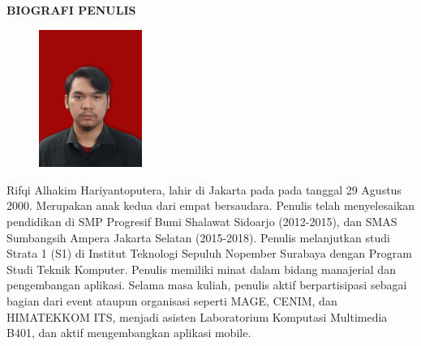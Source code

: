 \begin{center}
  \Large
  \textbf{BIOGRAFI PENULIS}
\end{center}


\vspace{2ex}

\begin{figure}
  \centering
  \vspace{-3ex}
  \includegraphics[width=0.3\textwidth]{gambar/hakim2.jpg}
  \vspace{-4ex}
\end{figure}

Rifqi Alhakim Hariyantoputera, lahir di Jakarta pada pada tanggal 29 Agustus 2000. Merupakan anak kedua dari empat bersaudara. Penulis telah menyelesaikan pendidikan di SMP Progresif Bumi Shalawat Sidoarjo (2012-2015), dan SMAS Sumbangsih Ampera Jakarta Selatan (2015-2018). Penulis melanjutkan studi Strata 1 (S1) di Institut Teknologi Sepuluh Nopember Surabaya dengan Program Studi Teknik Komputer. Penulis memiliki minat dalam bidang manajerial dan pengembangan aplikasi. Selama masa kuliah, penulis aktif berpartisipasi sebagai bagian dari event ataupun organisasi seperti MAGE, CENIM, dan HIMATEKKOM ITS, menjadi asisten Laboratorium Komputasi Multimedia B401, dan aktif mengembangkan aplikasi mobile.
